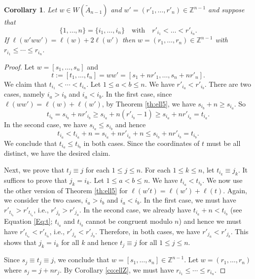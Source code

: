 \documentclass[12pt]{amsart}
\renewcommand{\ge}{\geqslant}
\renewcommand{\le}{\leqslant}
\newcommand{\bZ}{{\mathbb{Z}}}
\numberwithin{equation}{section}
\newtheorem{corollary}[equation]{Corollary}
\theoremstyle{definition}
\begin{document}
\begin{corollary}\label{co:ww'w}
Let $w\in W(\tilde A_{n-1})$ and $w'=(r'_1,\dots,r'_n)\in\bZ^{n-1}$ and
suppose that 
\[ \{1,\dots,n\}=\{i_1,\dots,i_n\}\quad \text{with} \quad
r'_{i_1}<\dots<r'_{i_n}. \] 
If $\ell(w'ww')=\ell(w)+2\ell(w')$
then $w=(r_1,\dots,r_n)\in\bZ^{n-1}$ with $r_{i_1}\le\cdots\le r_{i_n}$.
\end{corollary}
\begin{proof}
Let $w=[s_1,\ldots,s_n]$ and 
\[t:=[t_1,\ldots,t_n]=ww'=[s_1+nr'_1,\ldots,s_n+nr'_n].\] 
We claim that $t_{i_1}<\cdots<t_{i_n}$. Let $1\le a<b\le n$. We have
$r'_{i_a}<r'_{i_b}$. There are two cases, namely $i_a>i_b$ and
$i_a<i_b$. In the first case, since $\ell(ww')=\ell(w)+\ell(w')$, by
Theorem \ref{th:ell5}, we have $s_{i_b}+n\ge
s_{i_a}$. So 
\[t_{i_b}=s_{i_b}+nr'_{i_b}\ge s_{i_a}+n(r'_{i_b}-1)\ge
  s_{i_a}+nr'_{i_a}=t_{i_a}.\] 
In the second case, we have $s_{i_a}\le s_{i_b}$ and hence  
\begin{equation}\label{Eq:t}
t_{i_a}<t_{i_a}+n= s_{i_a}+nr'_{i_a}+n \le s_{i_b}+nr'_{i_b}=t_{i_b}.
\end{equation} 
We conclude that $t_{i_a}\le t_{i_b}$ in both cases. Since the
coordinates of $t$ must be all distinct, we have 
the desired claim. 

Next, we prove that $t_j\equiv j$ for each $1\le j\le n$. For each
$1\le k\le n$, let $t_{i_k}\equiv j_k$. It suffices to prove that
$j_k=i_k$. Let $1\le a<b\le n$. We have $t_{i_a}<t_{i_b}$. We now use
the other version of Theorem \ref{th:ell5} for
$\ell(w't)=\ell(w')+\ell(t)$. Again, we consider the two cases,
 $i_a>i_b$ and $i_a<i_b$. In the first case, we must have
$r'_{t_{i_b}}>r'_{t_{i_a}}$, i.e., $r'_{j_b}>r'_{j_a}$. In the second
case, we already have $t_{i_a}+n<t_{i_b}$ (see Equation \ref{Eq:t};
$t_{i_a}$ and $t_{i_b}$ cannot be congruent modulo $n$)
and hence we must have $r'_{t_{i_a}}<r'_{t_{i_b}}$, i.e.,
$r'_{j_a}<r'_{j_b}$. Therefore, in both cases, we have
$r'_{j_a}<r'_{j_b}$. This shows that $j_k=i_k$ for all $k$ and hence
$t_j\equiv j$ for all $1\le j\le n$.

Since $s_j\equiv t_j\equiv j$, we conclude that
$w=[s_1,\ldots,s_n]\in \bZ^{n-1}$. Let $w=(r_1,\ldots,r_n)$ where
$s_j=j+nr_j$. By Corollary \ref{co:ellZ}, we must have $r_{i_1}\le
\cdots\le r_{i_n}$.  
\end{proof}
\end{document}
